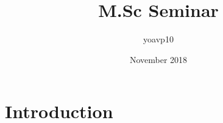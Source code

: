 \documentclass{article}
\title{M.Sc Seminar}
\author{yoavp10 }
\date{November 2018}
\begin{document}
\maketitle

\section{Introduction}
\end{document}
